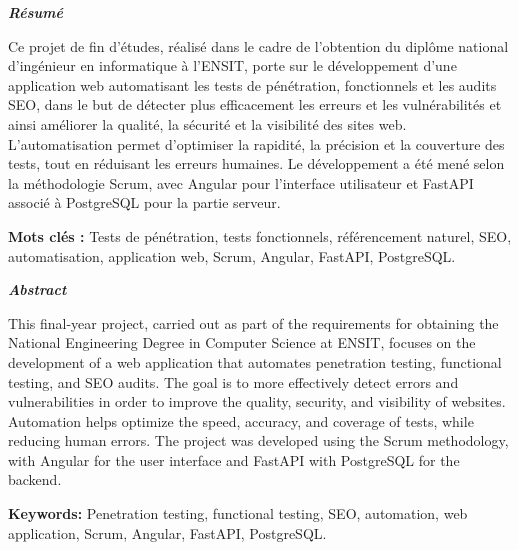 \thispagestyle{empty}
\enlargethispage{2cm}

\begin{center}
    \textbf{\textit{\Huge Résumé}}\\
\end{center}
\begin{tcolorbox}[colback=white!5!white,colframe=black!75!black]
\begin{justify}
Ce projet de fin d’études, réalisé dans le cadre de l’obtention du diplôme national d’ingénieur en informatique à l’ENSIT, porte sur le développement d’une application web automatisant les tests de pénétration, fonctionnels et les audits SEO, dans le but de détecter plus efficacement les erreurs et les vulnérabilités et ainsi améliorer la qualité, la sécurité et la visibilité des sites web. L’automatisation permet d’optimiser la rapidité, la précision et la couverture des tests, tout en réduisant les erreurs humaines. Le développement a été mené selon la méthodologie Scrum, avec Angular pour l’interface utilisateur et FastAPI associé à PostgreSQL pour la partie serveur. 
\end{justify}
\vspace{0.2cm}
\textbf{Mots clés :} Tests de pénétration, tests fonctionnels, référencement naturel, SEO, automatisation, application web, Scrum, Angular, FastAPI, PostgreSQL.
\end{tcolorbox}

\vspace{0.3cm}
\begin{center}
    \textbf{\textit{\Huge Abstract}}\\
\end{center}
\begin{tcolorbox}[colback=white!5!white,colframe=black!75!black]
\begin{justify}
This final-year project, carried out as part of the requirements for obtaining the National Engineering Degree in Computer Science at ENSIT, focuses on the development of a web application that automates penetration testing, functional testing, and SEO audits. The goal is to more effectively detect errors and vulnerabilities in order to improve the quality, security, and visibility of websites. Automation helps optimize the speed, accuracy, and coverage of tests, while reducing human errors. The project was developed using the Scrum methodology, with Angular for the user interface and FastAPI with PostgreSQL for the backend.
\end{justify}
\vspace{0.2cm}
\textbf{Keywords:} Penetration testing, functional testing, SEO, automation, web application, Scrum, Angular, FastAPI, PostgreSQL.
\end{tcolorbox}

